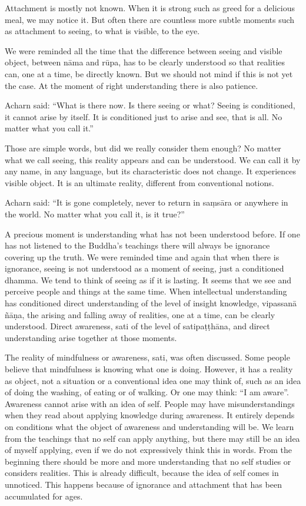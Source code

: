 Attachment is mostly not known. When it is strong such as greed for a
delicious meal, we may notice it. But often there are countless more
subtle moments such as attachment to seeing, to what is visible, to the
eye.

We were reminded all the time that the difference between seeing and
visible object, between nāma and rūpa, has to be clearly understood so
that realities can, one at a time, be directly known. But we should not
mind if this is not yet the case. At the moment of right understanding
there is also patience.

Acharn said: ``What is there now. Is there seeing or what? Seeing is
conditioned, it cannot arise by itself. It is conditioned just to arise
and see, that is all. No matter what you call it.''

Those are simple words, but did we really consider them enough? No
matter what we call seeing, this reality appears and can be understood.
We can call it by any name, in any language, but its characteristic does
not change. It experiences visible object. It is an ultimate reality,
different from conventional notions.

Acharn said: ``It is gone completely, never to return in saṃsāra or
anywhere in the world. No matter what you call it, is it true?''

A precious moment is understanding what has not been understood before.
If one has not listened to the Buddha's teachings there will always be
ignorance covering up the truth. We were reminded time and again that
when there is ignorance, seeing is not understood as a moment of seeing,
just a conditioned dhamma. We tend to think of seeing as if it is
lasting. It seems that we see and perceive people and things at the same
time. When intellectual understanding has conditioned direct
understanding of the level of insight knowledge, vipassanā ñāṇa, the
arising and falling away of realities, one at a time, can be clearly
understood. Direct awareness, sati of the level of satipaṭṭhāna, and
direct understanding arise together at those moments.

The reality of mindfulness or awareness, sati, was often discussed. Some
people believe that mindfulness is knowing what one is doing. However,
it has a reality as object, not a situation or a conventional idea one
may think of, such as an idea of doing the washing, of eating or of
walking. Or one may think: ``I am aware''. Awareness cannot arise with
an idea of self. People may have misunderstandings when they read about
applying knowledge during awareness. It entirely depends on conditions
what the object of awareness and understanding will be. We learn from
the teachings that no self can apply anything, but there may still be an
idea of myself applying, even if we do not expressively think this in
words. From the beginning there should be more and more understanding
that no self studies or considers realities. This is already difficult,
because the idea of self comes in unnoticed. This happens because of
ignorance and attachment that has been accumulated for ages.

